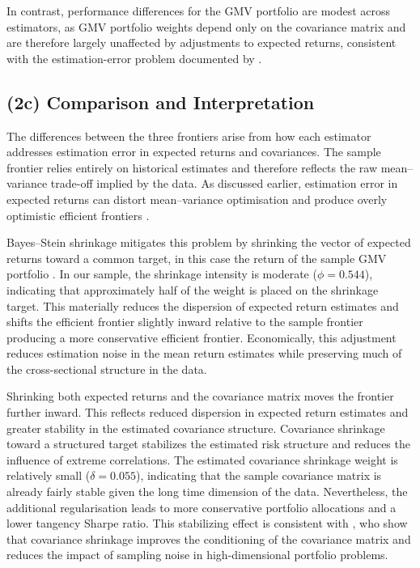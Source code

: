 \documentclass[11pt]{exam}
\begin{document}
\noindent In contrast, performance differences for the GMV portfolio are modest across estimators, as GMV portfolio weights depend only on the covariance matrix and are therefore largely unaffected by adjustments to expected returns, consistent with the estimation-error problem documented by \parencite{Michaud1989}.

\subsection{(2c) Comparison and Interpretation}

The differences between the three frontiers arise from how each estimator addresses estimation error in expected returns and covariances. The sample frontier relies entirely on historical estimates and therefore reflects the raw mean–variance trade-off implied by the data. As discussed earlier, estimation error in expected returns can distort mean–variance optimisation and produce overly optimistic efficient frontiers \parencite[]{Michaud1989}.

\noindent Bayes–Stein shrinkage mitigates this problem by shrinking the vector of expected returns toward a common target, in this case the return of the sample GMV portfolio \parencite{jorion1986}. In our sample, the shrinkage intensity is moderate ($\phi = 0.544$), indicating that approximately half of the weight is placed on the shrinkage target. This materially reduces the dispersion of expected return estimates and shifts the efficient frontier slightly inward relative to the sample frontier producing a more conservative efficient frontier. Economically, this adjustment reduces estimation noise in the mean return estimates while preserving much of the cross-sectional structure in the data.

\noindent Shrinking both expected returns and the covariance matrix moves the frontier further inward. This reflects reduced dispersion in expected return estimates and greater stability in the estimated covariance structure. Covariance shrinkage toward a structured target stabilizes the estimated risk structure and reduces the influence of extreme correlations. The estimated covariance shrinkage weight is relatively small ($\delta = 0.055$), indicating that the sample covariance matrix is already fairly stable given the long time dimension of the data. Nevertheless, the additional regularisation leads to more conservative portfolio allocations and a lower tangency Sharpe ratio. This stabilizing effect is consistent with \cite{LedoitWolf2004}, who show that covariance shrinkage improves the conditioning of the covariance matrix and reduces the impact of sampling noise in high-dimensional portfolio problems.
\end{document}
